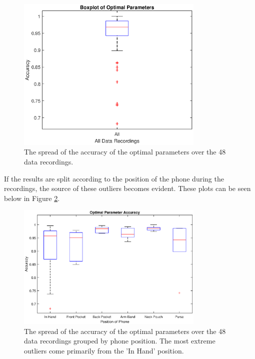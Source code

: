             \begin{figure}[!th]
                \includegraphics[width=0.8\textwidth]{Images/opt_params_overall.eps}
                \centering
                \caption{The spread of the accuracy of the optimal parameters over the 48 data recordings.}
                \label{img_opt_params_overall}
            \end{figure}

            If the results are split according to the position of the phone during the recordings, the source of these outliers becomes evident. These plots can be seen below in Figure \ref{img_opt_params_positions_bp}.

            \begin{figure}[!th]
                \includegraphics[width=0.8\textwidth]{Images/opt_params_positions_bp.eps}
                \centering
                \caption{The spread of the accuracy of the optimal parameters over the 48 data recordings grouped by phone position. The most extreme outliers come primarily from the 'In Hand' position.}
                \label{img_opt_params_positions_bp}
            \end{figure}

